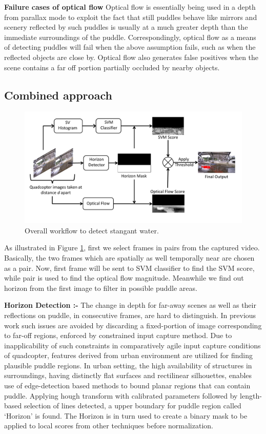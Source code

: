 \documentclass[times,10pt,twocolumn,letterpaper]{article}
\begin{document}
\textbf{Failure cases of optical flow}
Optical flow is essentially being used in a depth from parallax mode to exploit
the fact that still puddles behave like mirrors and scenery reflected by such
puddles is usually at a much greater depth than the immediate surroundings of
the puddle. Correspondingly, optical flow as a means of detecting puddles will
fail when the above assumption fails, such as when the reflected objects are
close by. Optical flow also generates false positives when the scene contains a
far off portion partially occluded by nearby objects.

\subsection{Combined approach}
\begin{figure}[h!]
\centering
\includegraphics[width=\linewidth]{images/overall_workflow.pdf}
\caption{Overall workflow to detect stangant water.}
\label{fig:workflow}
\end{figure}

As illustrated in Figure \ref{fig:workflow}, first we select frames in
pairs from the captured video. Basically, the two frames which are
spatially as well temporally near are chosen as a pair.  Now, first frame will
be sent to SVM classifier to find the SVM score, while pair is used to find the
optical flow magnitude. Meanwhile we find out horizon from the first image to
filter in possible puddle areas. 

\textbf{Horizon Detection :- }
The change in depth for far-away scenes as well as their reflections on puddle,
in consecutive frames, are hard to distinguish. In previous work \cite{rankin11}
such issues are avoided by discarding a fixed-portion of image corresponding to
far-off regions, enforced by constrained input capture method. Due to
inapplicability of such constraints in comparatively agile input capture
conditions of quadcopter, features derived from urban environment are utilized
for finding plausible puddle regions. In urban setting, the high availability
of structures in surroundings, having distinctly flat surfaces and rectilinear
silhouettes, enables use of edge-detection based methods to bound planar
regions that can contain puddle. Applying hough transform with calibrated
parameters followed by length-based selection of lines detected, a upper
boundary for puddle region called `Horizon' is found. The Horizon is in turn
used to create a binary mask to be applied to local scores from other
techniques before normalization.
\end{document}
